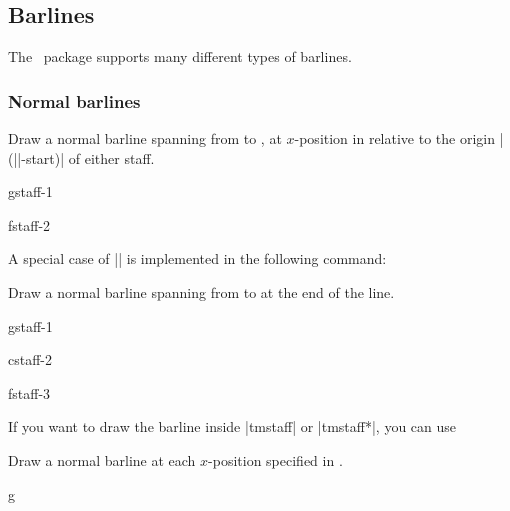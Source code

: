 \subsection{Barlines}\label{sec:multistaff:barlines}
The \tmname\ package supports many different types of barlines. 
\subsubsection{Normal barlines}\label{sec:multistaff:barlines:normal}
\begin{command}{\tmbarline{}}
  Draw a normal barline spanning from  to 
  , at $x$-position  in relative to 
  the origin |(||-start)| of either staff.
\end{command}
\begin{codeexample}[]
\begin{tmline}%
\begin{tmstaff}{g}{staff-1}\end{tmstaff}%
\begin{tmstaff}{f}{staff-2}\end{tmstaff}%
%
\end{tmline}
\end{codeexample}
A special case of |\tmbarline| is implemented in the following command:
\begin{command}{\tmbarlineendline{}}
  Draw a normal barline spanning from  to 
   at the end of the line.
\end{command}
\begin{codeexample}[]
\begin{tmline}
\begin{tmstaff}{g}{staff-1}\end{tmstaff}%
\begin{tmstaff}{c}{staff-2}\end{tmstaff}%
\begin{tmstaff}{f}{staff-3}\end{tmstaff}%
%
%
\end{tmline}
\end{codeexample}
If you want to draw the barline inside |{tmstaff}| or |{tmstaff*}|, 
you can use 
\begin{command}{\tmbarlineinline{}}
  Draw a normal barline at each $x$-position specified in .
\end{command}
\begin{codeexample}[]
\begin{tmline}%
\begin{tmstaff}{g}{}
\end{tmstaff}%
\end{tmline}
\end{codeexample}
